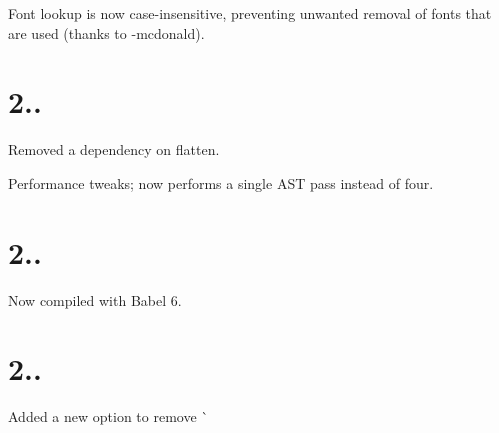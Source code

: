 
\begin{DoxyItemize}
\item Font lookup is now case-\/insensitive, preventing unwanted removal of fonts that are used (thanks to -\/mcdonald).
\end{DoxyItemize}

\section*{2..}


\begin{DoxyItemize}
\item Removed a dependency on {\ttfamily flatten}.
\item Performance tweaks; now performs a single A\+ST pass instead of four.
\end{DoxyItemize}

\section*{2..}


\begin{DoxyItemize}
\item Now compiled with Babel 6.
\end{DoxyItemize}

\section*{2..}


\begin{DoxyItemize}
\item Added a new option to remove \`{} 
\end{DoxyItemize}